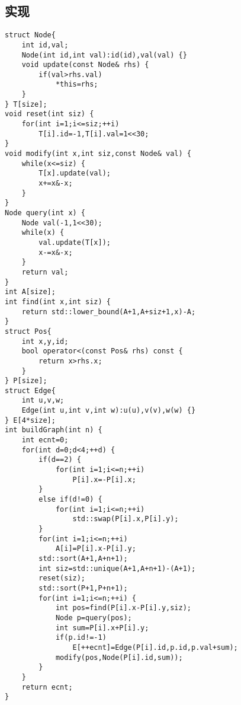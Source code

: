 \subsection{实现}
\begin{lstlisting}
struct Node{
    int id,val;
    Node(int id,int val):id(id),val(val) {}
    void update(const Node& rhs) {
        if(val>rhs.val)
            *this=rhs;
    }
} T[size];
void reset(int siz) {
    for(int i=1;i<=siz;++i)
        T[i].id=-1,T[i].val=1<<30;
}
void modify(int x,int siz,const Node& val) {
    while(x<=siz) {
        T[x].update(val);
        x+=x&-x;
    }
}
Node query(int x) {
    Node val(-1,1<<30);
    while(x) {
        val.update(T[x]);
        x-=x&-x;
    }
    return val;
}
int A[size];
int find(int x,int siz) {
    return std::lower_bound(A+1,A+siz+1,x)-A;
}
struct Pos{
    int x,y,id;
    bool operator<(const Pos& rhs) const {
        return x>rhs.x;
    }
} P[size];
struct Edge{
    int u,v,w;
    Edge(int u,int v,int w):u(u),v(v),w(w) {}
} E[4*size];
int buildGraph(int n) {
    int ecnt=0;
    for(int d=0;d<4;++d) {
        if(d==2) {
            for(int i=1;i<=n;++i)
                P[i].x=-P[i].x;
        }
        else if(d!=0) {
            for(int i=1;i<=n;++i)
                std::swap(P[i].x,P[i].y);
        }
        for(int i=1;i<=n;++i)
            A[i]=P[i].x-P[i].y;
        std::sort(A+1,A+n+1);
        int siz=std::unique(A+1,A+n+1)-(A+1);
        reset(siz);
        std::sort(P+1,P+n+1);
        for(int i=1;i<=n;++i) {
            int pos=find(P[i].x-P[i].y,siz);
            Node p=query(pos);
            int sum=P[i].x+P[i].y;
            if(p.id!=-1)
                E[++ecnt]=Edge(P[i].id,p.id,p.val+sum);
            modify(pos,Node(P[i].id,sum));
        }
    }
    return ecnt;
}
\end{lstlisting}
